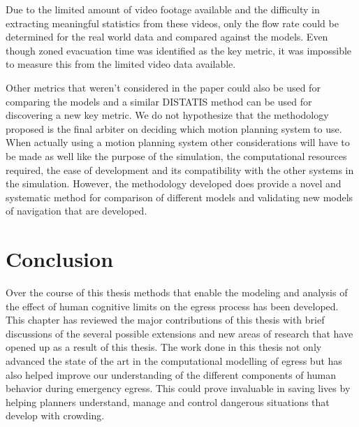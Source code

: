 Due to the limited amount of video footage available and the difficulty in extracting meaningful statistics from these videos, only the flow rate could be determined for the real world data and compared against the models. Even though zoned evacuation time was identified as the key metric, it was impossible to measure this from the limited video data available.

Other metrics that weren't considered in the paper could also be used for comparing the models and a similar DISTATIS method can be used for discovering a new key metric. We do not hypothesize that the methodology proposed is the final arbiter on deciding which motion planning system to use. When actually using a motion planning system other considerations will have to be made as well like the purpose of the simulation, the computational resources required, the ease of development and its compatibility with the other systems in the simulation. However, the methodology developed does provide a novel and systematic method for comparison of different models and validating new models of navigation that are developed.


\section{Conclusion} %
\label{sec:conclusion_of_conclusion}

Over the course of this thesis methods that enable the modeling and analysis of the effect of human cognitive limits on the egress process has been developed. This chapter has reviewed the major contributions of this thesis with brief discussions of the several possible extensions and new areas of research that have opened up as a result of this thesis. The work done in this thesis not only advanced the state of the art in the computational modelling of egress but has also helped improve our understanding of the different components of human behavior during emergency egress. This could prove invaluable in saving lives by helping planners understand, manage and control dangerous situations that develop with crowding.
